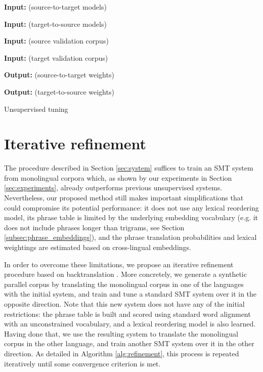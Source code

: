 \documentclass[11pt,a4paper]{article}
\begin{document}
\begin{algorithm}[t]
\begin{algorithmic}[1]
\item[\textbf{Input:}  (source-to-target models)]
\item[\textbf{Input:}  (target-to-source models)]
\item[\textbf{Input:}  (source validation corpus)]
\item[\textbf{Input:}  (target validation corpus)]
\item[\textbf{Output:}  (source-to-target weights)]
\item[\textbf{Output:}  (target-to-source weights)]
\State  {}
\Repeat
  \State  {}
  \State  {}
  \State  {}
  \State  {}
\end{algorithmic}
\caption{Unsupervised tuning}
\label{alg:tuning}
\end{algorithm}


\section{Iterative refinement} \label{sec:backtranslation}
The procedure described in Section \ref{sec:system} suffices to train an SMT system from monolingual corpora which, as shown by our experiments in Section \ref{sec:experiments}, already outperforms previous unsupervised systems. Nevertheless, our proposed method still makes important simplifications that could compromise its potential performance: it does not use any lexical reordering model, its phrase table is limited by the underlying embedding vocabulary (e.g. it does not include phrases longer than trigrams, see Section \ref{subsec:phrase_embeddings}), and the phrase translation probabilities and lexical weightings are estimated based on cross-lingual embeddings.

In order to overcome these limitations, we propose an iterative refinement procedure based on backtranslation \citep{sennrich2016improving}. More concretely, we generate a synthetic parallel corpus by translating the monolingual corpus in one of the languages with the initial system, and train and tune a standard SMT system over it in the opposite direction. Note that this new system does not have any of the initial restrictions: the phrase table is built and scored using standard word alignment with an unconstrained vocabulary, and a lexical reordering model is also learned. Having done that, we use the resulting system to translate the monolingual corpus in the other language, and train another SMT system over it in the other direction. As detailed in Algorithm \ref{alg:refinement}, this process is repeated iteratively until some convergence criterion is met.
\end{document}
